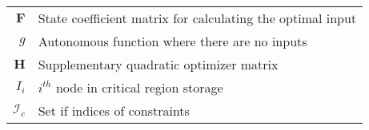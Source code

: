 \begin{scriptsize}
\begin{tabularx}{\textwidth}{r|X}
$\textbf{F}$                & State coefficient matrix for calculating the optimal input \\
$g$                         & Autonomous function where there are no inputs\\
$\textbf{H}$                & Supplementary quadratic optimizer matrix\\
$I_i$                           & $i^{th}$ node in critical region storage\\
$\mathcal{I}_c$               & Set if indices of constraints\\

\end{tabularx}
\end{scriptsize}
